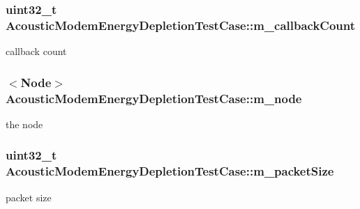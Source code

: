 \subsubsection[{\texorpdfstring{m\+\_\+callback\+Count}{m_callbackCount}}]{\setlength{\rightskip}{0pt plus 5cm}uint32\+\_\+t Acoustic\+Modem\+Energy\+Depletion\+Test\+Case\+::m\+\_\+callback\+Count}\hypertarget{classAcousticModemEnergyDepletionTestCase_aab78b851effc5b78aabd4f82cf0007e2}{}\label{classAcousticModemEnergyDepletionTestCase_aab78b851effc5b78aabd4f82cf0007e2}


callback count 

\subsubsection[{\texorpdfstring{m\+\_\+node}{m_node}}]{$<${\bf Node}$>$ Acoustic\+Modem\+Energy\+Depletion\+Test\+Case\+::m\+\_\+node}\hypertarget{classAcousticModemEnergyDepletionTestCase_aad8287a51fe09423d58935484fb3ac6d}{}\label{classAcousticModemEnergyDepletionTestCase_aad8287a51fe09423d58935484fb3ac6d}


the node 

\subsubsection[{\texorpdfstring{m\+\_\+packet\+Size}{m_packetSize}}]{\setlength{\rightskip}{0pt plus 5cm}uint32\+\_\+t Acoustic\+Modem\+Energy\+Depletion\+Test\+Case\+::m\+\_\+packet\+Size}\hypertarget{classAcousticModemEnergyDepletionTestCase_a27cef9a0ab916df25d00c58793619087}{}\label{classAcousticModemEnergyDepletionTestCase_a27cef9a0ab916df25d00c58793619087}


packet size 

